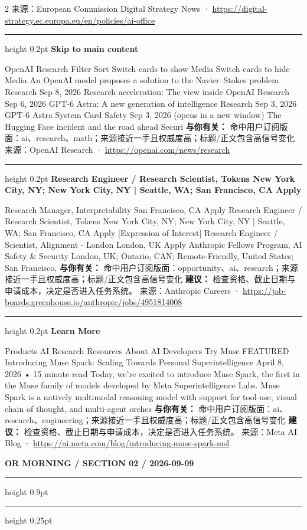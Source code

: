 \documentclass[10.5pt]{ctexart}
\begin{document}
\begin{multicols}{2}
{\footnotesize\color{ormuted} 来源：European Commission Digital Strategy News · \url{https://digital-strategy.ec.europa.eu/en/policies/ai-office}}
\vspace{2mm}
\hrule height 0.2pt
\vspace{2mm}
{\large\bfseries Skip to main content}\par
OpenAI Research Filter Sort Switch cards to show Media Switch cards to hide Media An OpenAI model proposes a solution to the Navier–Stokes problem Research Sep 8, 2026 Research acceleration: The view inside OpenAI Research Sep 6, 2026 GPT-6 Astra: A new generation of intelligence Research Sep 3, 2026 GPT‑6 Astra System Card Safety Sep 3, 2026 (opens in a new window) The Hugging Face incident and the road ahead Securi
\textbf{与你有关：} 命中用户订阅版面：ai、research、math；来源接近一手且权威度高；标题/正文包含高信号变化
{\footnotesize\color{ormuted} 来源：OpenAI Research · \url{https://openai.com/news/research}}
\vspace{2mm}
\hrule height 0.2pt
\vspace{2mm}
{\large\bfseries Research Engineer / Research Scientist, Tokens New York City, NY; New York City, NY | Seattle, WA; San Francisco, CA Apply}\par
[Expression of Interest] Research Manager, Interpretability San Francisco, CA Apply Research Engineer / Research Scientist, Tokens New York City, NY; New York City, NY | Seattle, WA; San Francisco, CA Apply [Expression of Interest] Research Engineer / Scientist, Alignment - London London, UK Apply Anthropic Fellows Program, AI Safety \& Security London, UK; Ontario, CAN; Remote-Friendly, United States; San Francisco, 
\textbf{与你有关：} 命中用户订阅版面：opportunity、ai、research；来源接近一手且权威度高；标题/正文包含高信号变化
\textbf{建议：} 检查资格、截止日期与申请成本，决定是否进入任务系统。
{\footnotesize\color{ormuted} 来源：Anthropic Careers · \url{https://job-boards.greenhouse.io/anthropic/jobs/4951814008}}
\vspace{2mm}
\hrule height 0.2pt
\vspace{2mm}
{\large\bfseries Learn More}\par
Products AI Research Resources About AI Developers Try Muse FEATURED Introducing Muse Spark: Scaling Towards Personal Superintelligence April 8, 2026 • 15 minute read Today, we’re excited to introduce Muse Spark, the first in the Muse family of models developed by Meta Superintelligence Labs. Muse Spark is a natively multimodal reasoning model with support for tool-use, visual chain of thought, and multi-agent orches
\textbf{与你有关：} 命中用户订阅版面：ai、research、engineering；来源接近一手且权威度高；标题/正文包含高信号变化
\textbf{建议：} 检查资格、截止日期与申请成本，决定是否进入任务系统。
{\footnotesize\color{ormuted} 来源：Meta AI Blog · \url{https://ai.meta.com/blog/introducing-muse-spark-msl}}
\end{multicols}
\newpage
{\small\bfseries OR MORNING / SECTION 02 / 2026-09-09}
\vspace{2mm}
\hrule height 0.9pt
\vspace{1.5mm}
\hrule height 0.25pt
\vspace{4mm}
\end{document}
